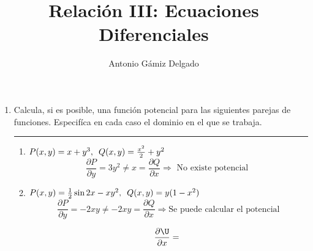 \documentclass[12pt]{article}
\newcommand{\p}[2]{\frac{\partial#1}{\partial#2}}
\begin{document}

\author{Antonio Gámiz Delgado}
\title{Relación III: Ecuaciones Diferenciales}
\maketitle

\begin{enumerate}

\hrule
\item Calcula, si es posible, una función potencial para las siguientes parejas de funciones. Especifíca en cada caso el dominio en el que se trabaja.
\hrule
\begin{enumerate}
\item $P(x,y)=x+y^3, \enskip Q(x,y)=\frac{x^2}{2}+y^2$
\[
\p{P}{y}=3y^2\neq x=\p{Q}{x} \Longrightarrow \text{ No existe potencial  }
\]

\item $P(x,y)=\frac{1}{2}\sin 2x-xy^2, \enskip Q(x,y)=y(1-x^2)$
\[
\p{P}{y}=-2xy \neq -2xy=\p{Q}{x} \Longrightarrow \text{Se puede calcular el potencial}
\]

\[
\p{\U}{x}=\
\]
\end{enumerate}
\end{enumerate}
\end{document}
